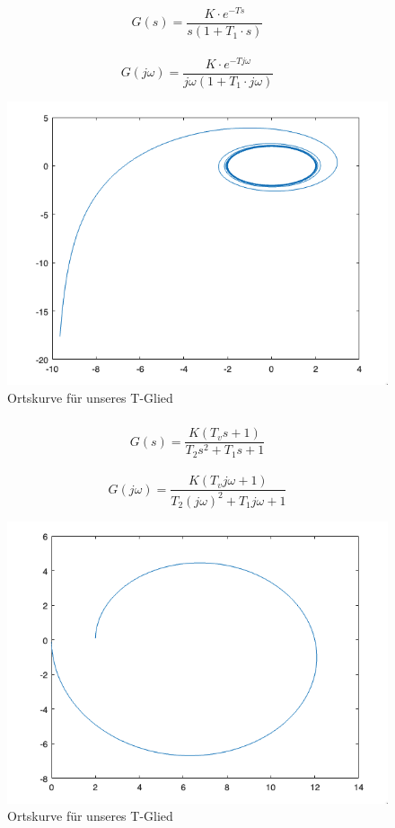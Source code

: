\documentclass{article}
\begin{document}
			\subsubsection{}
				$$G(s) = \frac{K\cdot e^{-Ts}}{s(1+T_1\cdot s)}$$
				\\
				$$G(j\omega) = \frac{K\cdot e^{-Tj\omega}}{j\omega(1+T_1\cdot j\omega)}$$
				\begin{figure}[h]
					\includegraphics[scale = 0.7]{./Ortskurve_3_3.png}
					\caption{Ortskurve für unseres T-Glied}
					\label{fig3: Ortskurve}
				\end{figure}
\newpage
			\subsubsection{}
				$$G(s) = \frac{K(T_vs+1)}{T_2s^2 + T_1s + 1}$$
				\\
				$$G(j\omega) = \frac{K(T_vj\omega + 1)}{T_2(j\omega)^2 + T_1j\omega + 1}$$
				\begin{figure}[h]
					\includegraphics[scale = 0.7]{./Ortskurve_3_4.png}
					\caption{Ortskurve für unseres T-Glied}
					\label{fig3: Ortskurve}
				\end{figure}
		\newpage
\end{document}
